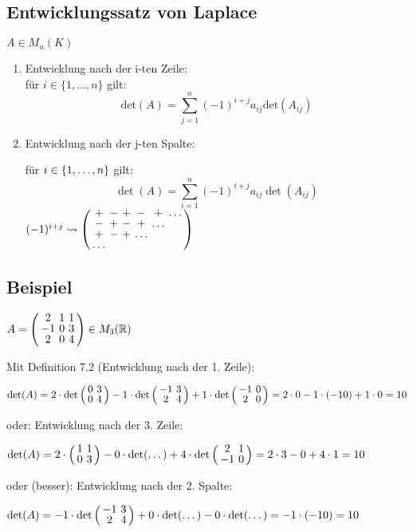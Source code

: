 \subsection{Entwicklungssatz von Laplace}
$A\in M_n(K)$
 \begin{enumerate}
 	\item
 	Entwicklung nach der i-ten Zeile:\\
 	für $i\in \lbrace 1,\dots,n\rbrace $ gilt:
 	\[\mathrm{det}(A)=\sum_{j=1}^n (-1)^{i+j} a_{ij}\mathrm{det}(A_{ij})\]
 	\item
 	Entwicklung nach der j-ten Spalte:
 	
 	für $i \in \left\{1, \dots, n\right\}$ gilt:
 	\[\det(A) = \sum_{i=1}^{n}(-1)^{i+j}a_{ij}\det(A_{ij})\]
 	$(-1)^{i+j} \rightsquigarrow \aMatrix{cccccc}{
 	+ & - & + & - & + & \dots \\
 	- & + & - & + & \dots \\
 	+ & - & + & \dots \\
 	\dots}$
 \end{enumerate}
 
 \subsection{Beispiel}
 
 
 $A = \aMatrix{ccc}{
 2 	& 1	& 1 \\
 -1	& 0 & 3 \\
 2	& 0 & 4}  \in M_3(\R)$


Mit Definition 7.2 %
(Entwicklung nach der 1. Zeile):

$\det(A) = 2 \cdot \det \aMatrix{cc}{0 & 3 \\ 0 & 4} 
	- 1 \cdot \det \aMatrix{cc}{-1 & 3 \\ 2 & 4}
	+ 1 \cdot \det \aMatrix{cc}{-1 & 0 \\ 2 & 0}
  = 2 \cdot 0 - 1 \cdot (-10) + 1 \cdot 0 
  = 10$ 
	
oder: Entwicklung nach der 3. Zeile:

$\det(A) = 2 \cdot \aMatrix{cc}{1 & 1 \\ 0 & 3} 
	- 0 \cdot \det (\dots) 
	+ 4 \cdot \det \aMatrix{cc}{2 & 1 \\ -1 & 0}
  = 2 \cdot 3 - 0 + 4 \cdot 1 
  = 10$ 
  
oder (besser): Entwicklung nach der 2. Spalte:

$\det(A) = -1 \cdot \det \aMatrix{cc}{-1 & 3 \\ 2 & 4}
	+ 0 \cdot \det (\dots)
	- 0 \cdot \det (\dots)
  = -1 \cdot (-10)
  = 10$
  
